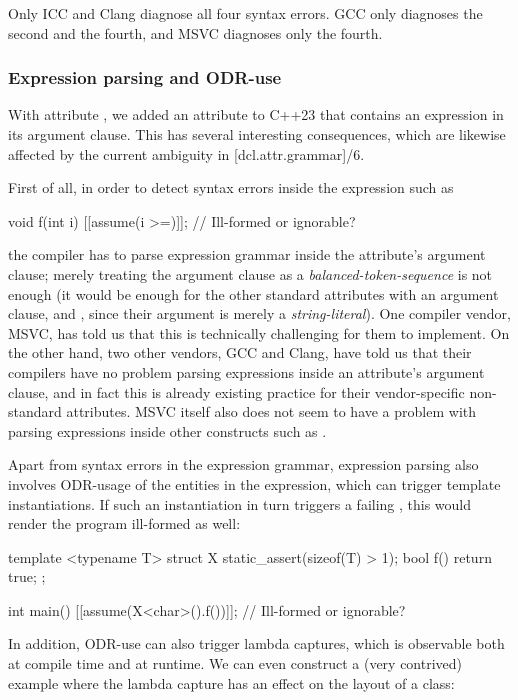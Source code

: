 Only ICC and Clang diagnose all four syntax errors. GCC only diagnoses the second and the fourth, and MSVC diagnoses only the fourth.

\subsubsection{Expression parsing and ODR-use}
\label{subsubsec:odruse}

With attribute  \cite{P1774R8}, we added an attribute to C++23 that contains an expression in its argument clause. This has several interesting consequences, which are likewise affected by the current ambiguity in [dcl.attr.grammar]/6.

First of all, in order to detect syntax errors inside the expression such as
\begin{codeblock}
void f(int i) {
  [[assume(i >=)]];  // Ill-formed or ignorable?
}
\end{codeblock}
the compiler has to parse expression grammar inside the attribute's argument clause; merely treating the argument clause as a \emph{balanced-token-sequence} is not enough (it would be enough for the other standard attributes with an argument clause,  and , since their argument is merely a \emph{string-literal}). One compiler vendor, MSVC, has told us that this is technically challenging for them to implement. On the other hand, two other vendors, GCC and Clang, have told us that their compilers have no problem parsing expressions inside an attribute's argument clause, and in fact this is already existing practice for their vendor-specific non-standard attributes. MSVC itself also does not seem to have a problem with parsing expressions inside other constructs such as .

 Apart from syntax errors in the expression grammar, expression parsing also involves ODR-usage of the entities in the expression, which can trigger template instantiations. If such an instantiation in turn triggers a failing , this would render the program ill-formed as well:
 
\begin{codeblock}
template <typename T>
struct X {
  static_assert(sizeof(T) > 1);
  bool f() { return true; }
};

int main() {
  [[assume(X<char>().f())]];  // Ill-formed or ignorable?
}
\end{codeblock}

In addition, ODR-use can also trigger lambda captures, which is observable both at compile time and at runtime. We can even construct a (very contrived) example where the lambda capture has an effect on the layout of a class:


